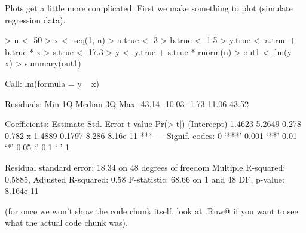 \documentclass{article}
\begin{document}
\pagebreak[3]
Plots get a little more complicated.  First we make something to plot
(simulate regression data).
\begin{Schunk}
\begin{Sinput}
> n <- 50
> x <- seq(1, n)
> a.true <- 3
> b.true <- 1.5
> y.true <- a.true + b.true * x
> s.true <- 17.3
> y <- y.true + s.true * rnorm(n)
> out1 <- lm(y ~ x)
> summary(out1)
\end{Sinput}
\begin{Soutput}
Call:
lm(formula = y ~ x)

Residuals:
   Min     1Q Median     3Q    Max 
-43.14 -10.03  -1.73  11.06  43.52 

Coefficients:
            Estimate Std. Error t value Pr(>|t|)    
(Intercept)   1.4623     5.2649   0.278    0.782    
x             1.4889     0.1797   8.286 8.16e-11 ***
---
Signif. codes:  0 ‘***’ 0.001 ‘**’ 0.01 ‘*’ 0.05 ‘.’ 0.1 ‘ ’ 1

Residual standard error: 18.34 on 48 degrees of freedom
Multiple R-squared:  0.5885,	Adjusted R-squared:   0.58 
F-statistic: 68.66 on 1 and 48 DF,  p-value: 8.164e-11
\end{Soutput}
\end{Schunk}
(for once we won't show the code chunk itself, look at \verb@foo.Rnw@
if you want to see what the actual code chunk was).
\end{document}
